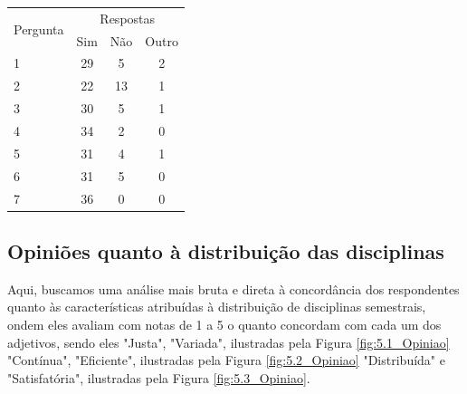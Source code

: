         \begin{table}[]
            \centering
            \label{table:4_Atrasos}
            \begin{tabular}{@{}|lccc|@{}}
                \toprule
                \multicolumn{1}{|c|}{\multirow{2}{*}{Pergunta}} & \multicolumn{3}{c|}{Respostas}                              \\
                \multicolumn{1}{|c|}{}                          & \multicolumn{1}{c|}{Sim} & \multicolumn{1}{c|}{Não} & Outro \\ \midrule
                1                                               &                      29  &                        5 &     2 \\ \midrule
                2                                               &                      22  &                       13 &     1 \\ \midrule
                3                                               &                      30  &                        5 &     1 \\ \midrule
                4                                               &                      34  &                        2 &     0 \\ \midrule
                5                                               &                      31  &                        4 &     1 \\ \midrule
                6                                               &                      31  &                        5 &     0 \\ \midrule
                7                                               &                      36  &                        0 &     0 \\ \bottomrule
            \end{tabular}
        \end{table}

    \subsection{Opiniões quanto à distribuição das disciplinas} %

        Aqui, buscamos uma análise mais bruta e direta à concordância dos respondentes quanto às características atribuídas à distribuição de disciplinas semestrais, ondem eles avaliam com notas de 1 a 5 o quanto concordam com cada um dos adjetivos, sendo eles "Justa", "Variada", ilustradas pela Figura \ref{fig:5.1_Opiniao} "Contínua", "Eficiente", ilustradas pela Figura \ref{fig:5.2_Opiniao} "Distribuída" e "Satisfatória", ilustradas pela Figura \ref{fig:5.3_Opiniao}.

